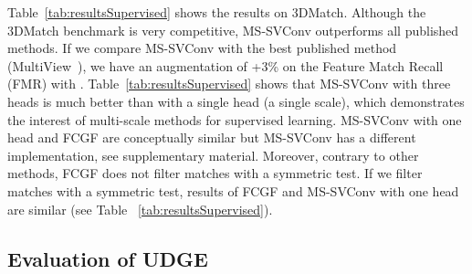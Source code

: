 \documentclass[10pt,twocolumn,letterpaper]{article}
\begin{document}
Table~\ref{tab:resultsSupervised} shows the results on 3DMatch. Although the 3DMatch benchmark is very competitive, MS-SVConv outperforms all published methods. If we compare MS-SVConv with the best published method (MultiView~\cite{Li_2020_CVPR}), we have an augmentation of +3\% on the Feature Match Recall (FMR) with . Table~\ref{tab:resultsSupervised} shows that MS-SVConv with three heads is much better than with a single head (a single scale), which demonstrates the interest of multi-scale methods for supervised learning. MS-SVConv with one head and FCGF are conceptually similar but MS-SVConv has a different implementation, see supplementary material. Moreover, contrary to other methods, FCGF does not filter matches with a symmetric test. If we filter matches with a symmetric test, results of FCGF and MS-SVConv with one head are similar (see Table ~\ref{tab:resultsSupervised}).


\subsection{Evaluation of UDGE}
\end{document}

